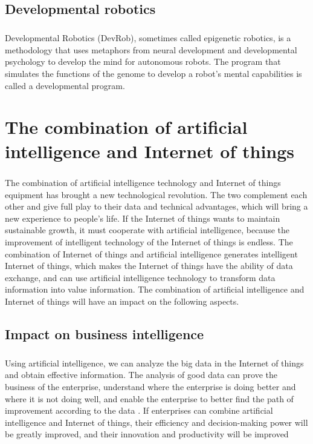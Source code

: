 \documentclass[12pt]{report}
\begin{document}
\section{Developmental robotics}
\paragraph{} Developmental Robotics (DevRob), sometimes called epigenetic
robotics, is a methodology that uses metaphors from neural development and developmental
psychology to develop the mind for autonomous robots. The program that simulates the functions
of the genome to develop a robot’s mental capabilities is called a developmental program.

\newpage
\chapter{The combination of artificial intelligence and Internet of things}
\paragraph{}The combination of artificial intelligence technology and Internet of things equipment has brought
a new technological revolution. The two complement each other and give full play to their data
and technical advantages, which will bring a new experience to people’s life. If the Internet of
things wants to maintain sustainable growth, it must cooperate with artificial intelligence, because
the improvement of intelligent technology of the Internet of things is endless. The combination of
Internet of things and artificial intelligence generates intelligent Internet of things, which makes
the Internet of things have the ability of data exchange, and can use artificial intelligence
technology to transform data information into value information. The combination of artificial
intelligence and Internet of things will have an impact on the following aspects.
\section{Impact on business intelligence}
\paragraph{}Using artificial intelligence, we can analyze the big data in
the Internet of things and obtain effective information. The analysis of good data can prove the
business of the enterprise, understand where the enterprise is doing better and where it is not
doing well, and enable the enterprise to better find the path of improvement according to the data .
If enterprises can combine artificial intelligence and Internet of things, their efficiency and
decision-making power will be greatly improved, and their innovation and productivity will be
improved
\end{document}
